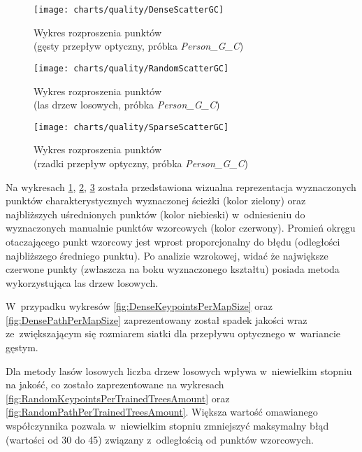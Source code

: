     \newpage
      \begin{figure}[!ht]
        \centering
        \texttt{[image: charts/quality/DenseScatterGC]}
        \caption[Wykres rozproszenia punktów (gęsty przepływ optyczny)]
                {Wykres rozproszenia punktów\\(gęsty przepływ optyczny, próbka \textit{Person\_G\_C})}
        \label{fig:DenseScatterGC}
      \end{figure}

      \begin{figure}[!ht]
        \centering
        \texttt{[image: charts/quality/RandomScatterGC]}
        \caption[Wykres rozproszenia punktów (las drzew losowych)]
                {Wykres rozproszenia punktów\\(las drzew losowych, próbka \textit{Person\_G\_C})}
        \label{fig:RandomScatterGC}
      \end{figure}

    \newpage
      \begin{figure}[!ht]
        \centering
        \texttt{[image: charts/quality/SparseScatterGC]}
        \caption[Wykres rozproszenia punktów (rzadki przepływ optyczny)]
                {Wykres rozproszenia punktów\\(rzadki przepływ optyczny, próbka \textit{Person\_G\_C})}
        \label{fig:SparseScatterGC}
      \end{figure}

    Na wykresach \ref{fig:DenseScatterGC}, \ref{fig:RandomScatterGC}, \ref{fig:SparseScatterGC} została przedstawiona wizualna reprezentacja wyznaczonych punktów charakterystycznych wyznaczonej ścieżki (kolor zielony) oraz najbliższych uśrednionych punktów (kolor niebieski) w~odniesieniu do wyznaczonych manualnie punktów wzorcowych (kolor czerwony). Promień okręgu otaczającego punkt wzorcowy jest wprost proporcjonalny do błędu (odległości najbliższego średniego punktu). Po analizie wzrokowej, widać że największe czerwone punkty (zwłaszcza na boku wyznaczonego kształtu) posiada metoda wykorzystująca las drzew losowych.

    W~przypadku wykresów \ref{fig:DenseKeypointsPerMapSize} oraz \ref{fig:DensePathPerMapSize} zaprezentowany został spadek jakości wraz ze~zwiększającym się rozmiarem siatki dla przepływu optycznego w~wariancie gęstym.

    Dla metody lasów losowych liczba drzew losowych wpływa w~niewielkim stopniu na jakość, co zostało zaprezentowane na wykresach \ref{fig:RandomKeypointsPerTrainedTreesAmount} oraz \ref{fig:RandomPathPerTrainedTreesAmount}. Większa wartość omawianego współczynnika pozwala w~niewielkim stopniu zmniejszyć maksymalny błąd (wartości od 30 do 45) związany z~odległością od punktów wzorcowych.

